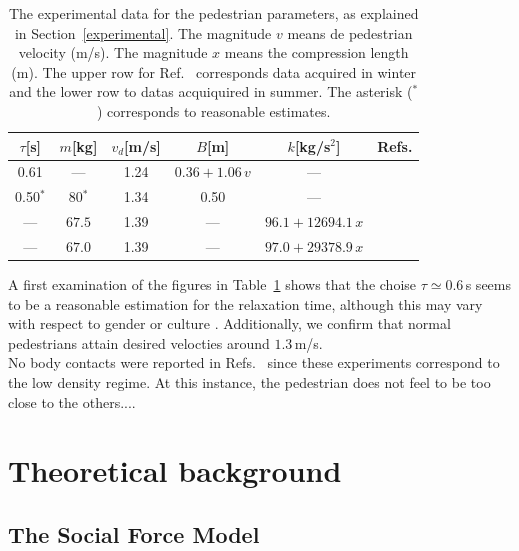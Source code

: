 \documentclass[preprint,12pt]{elsarticle}
\begin{document}
\begin{table}
\begin{tabular}{cccccc}
 \hline
 $\tau$[s]   & $m$[kg]     & $v_d$[m/s]  &  $B$[m]  & $k$[kg/s$^2$] &  Refs. \\
 \hline
0.61         & ---         & 1.24 & $0.36+1.06\,v$ &  ---                 &  
 \cite{seyfried_2007} \\
0.50$^*$     & 80$^*$      & 1.34 & 0.50           &  ---                 &  
\cite{weidmann_1992,lakoba_2005}\\
---          & $67.5$      & 1.39 &  ---           &  $96.1 + 12694.1\,x$ & 
\cite{song_2019}\\
---          & $67.0$      & 1.39 &  ---           &  $97.0 + 29378.9\,x$ & 
\cite{song_2019}\\



\hline
\end{tabular}
\caption{The experimental data for the pedestrian parameters, as explained in 
Section~\ref{experimental}. The magnitude $v$ means de pedestrian velocity 
(m/s). The magnitude $x$ means the compression length (m). The upper row for 
Ref.~\cite{song_2019} corresponds data acquired in winter and the lower row to 
datas acquiquired in summer. The asterisk ($^*$) corresponds to reasonable 
estimates. }
\label{table_data}
\end{table}

A first examination of the figures in Table~\ref{table_data} shows that the 
choise $\tau\simeq0.6\,$s seems to be a reasonable estimation for the 
relaxation time, although this may vary with respect to gender or culture 
\cite{siddharth_2018}. Additionally, we confirm that normal pedestrians attain 
desired velocties around $1.3\,$m/s. \\

No body contacts were reported in Refs.~\cite{seyfried_2007,weidmann_1992} 
since these experiments correspond to the low density regime. At this instance, 
the pedestrian does not feel to be too close to the others....    \\ 



\section{\label{background}Theoretical background}

\subsection{\label{sfm}The Social Force Model}
\end{document}
